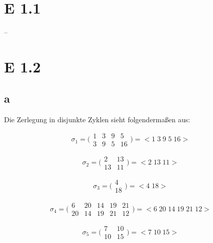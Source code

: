 \documentclass[12pt]{article}
\begin{document}
\section*{E 1.1}
--

\section*{E 1.2}
\subsection*{a}
Die Zerlegung in disjunkte Zyklen sieht folgendermaßen aus:

\begin{equation*}
\sigma_1 = \bigl( \begin{smallmatrix}
1 & 3 & 9 & 5  \\
3 & 9 & 5 & 16 
\end{smallmatrix}\bigr) = \bigl  < 1 \; 3\; 9\; 5\; 16 \bigr > 
\end{equation*}

\begin{equation*}
\sigma_2 = \bigl( \begin{smallmatrix}
2  & 13 \\
13 & 11
\end{smallmatrix} \bigr) = \bigl < 2\; 13\; 11 \bigr >
\end{equation*}

\begin{equation*}
\sigma_3 =
\bigl(\begin{smallmatrix}
4  \\
18
\end{smallmatrix}\bigr) = \bigl < 4\; 18 \bigr >
\end{equation*}

\begin{equation*}
\sigma_4 =
\bigl(\begin{smallmatrix}
6  & 20 & 14 & 19 & 21\\
20 & 14 & 19 & 21 & 12
\end{smallmatrix}\bigr) = \bigl < 6 \; 20\; 14\; 19\; 21\; 12 \bigr >
\end{equation*}

\begin{equation*}
\sigma_5 =
\bigl(\begin{smallmatrix}
7  & 10 \\
10 & 15
\end{smallmatrix}\bigr) = \bigl < 7\; 10\; 15 \bigr >
\end{equation*}
\end{document}
